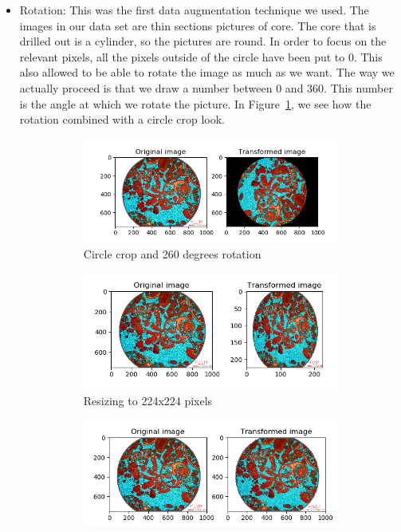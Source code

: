 \begin{itemize}
    \item Rotation: This was the first data augmentation technique we used. The images in our data set are thin sections pictures of core. The core that is drilled out is a cylinder, so the pictures are round. In order to focus on the relevant pixels, all the pixels outside of the circle have been put to 0. This also allowed to be able to rotate the image as much as we want. The way we actually proceed is that we draw a number between 0 and 360. This number is the angle at which we rotate the picture. In Figure~\ref{fig:rotate}, we see how the rotation combined with a circle crop look.
\begin{figure}
\begin{subfigure}{.5\textwidth}
  \centering
  \includegraphics[width=1\linewidth]{figures/03-rotation_260}
  \caption{Circle crop and 260 degrees rotation}
  \label{fig:rotate}
\end{subfigure}%
\begin{subfigure}{.5\textwidth}
  \centering
  \includegraphics[width=1\linewidth]{figures/03-resize.PNG}
  \caption{Resizing to 224x224 pixels}
  \label{fig:resize}
\end{subfigure}
\begin{subfigure}{.5\textwidth}
  \centering
  \includegraphics[width=1\linewidth]{figures/03-elastic_trans_08_03.PNG}

\end{subfigure}
\end{figure}
\end{itemize}
